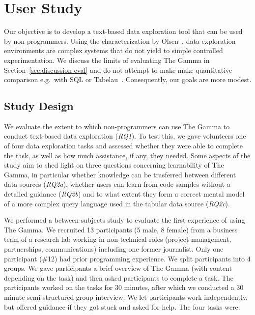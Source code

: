 \documentclass[manuscript,review,anonymous]{acmart}
\begin{document}
\section{User Study}
\label{sec:study}

Our objective is to develop a text-based data exploration tool that can be used by non-programmers.
Using the characterization by Olsen~\cite{evaluating}, data exploration environments are complex
systems that do not yield to simple controlled experimentation. We discuss the limits of evaluating
The Gamma in Section~\ref{sec:discussion-eval} and do not attempt to make make quantitative comparison
e.g.~with SQL or Tabelau~\cite{tableau}. Consequently, our goals are more modest.

\subsection{Study Design}
We evaluate the extent to which non-programmers can use The Gamma to conduct
text-based data exploration (\emph{RQ1}). To test this, we gave volunteers one of four data
exploration tasks and assessed whether they were able to complete the task, as well as how much
assistance, if any, they needed.
%
Some aspects of the study aim to shed light on three questions concerning learnability
of The Gamma, in particular whether knowledge can be trasferred between different data sources
(\emph{RQ2a}), whether users can learn from code samples without a detailed guidance
(\emph{RQ2b}) and to what extent they form a correct mental model of a more complex query
language used in the tabular data source (\emph{RQ2c}).

We performed a between-subjects study to evaluate the first experience of using The Gamma.
We recruited 13 participants (5 male, 8 female) from a business team
of a research lab working in non-technical roles (project management,
partnerships, communications) including one former journalist.  Only one participant (\#12)
had prior programming experience. We split participants into 4 groups. We gave participants a
brief overview of The Gamma (with content depending on the task) and then asked participants
to complete a task. The participants worked on the tasks for 30 minutes, after which we conducted
a 30 minute semi-structured group interview. We let participants work independently, but offered
guidance if they got stuck and asked for help. The four tasks were:
\end{document}
